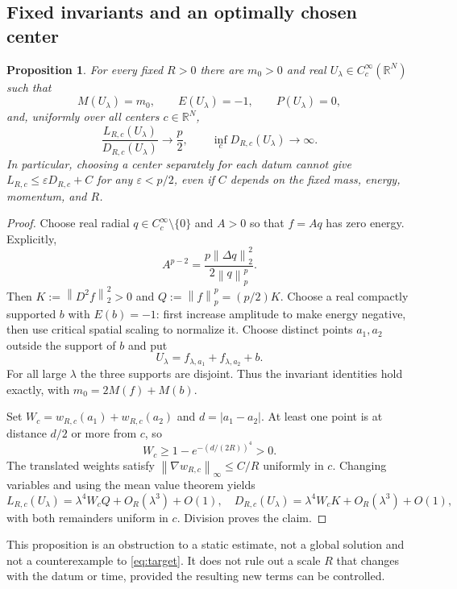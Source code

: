\documentclass[11pt,a4paper]{article}
\newtheorem{proposition}[theorem]{Proposition}
\theoremstyle{remark}\newtheorem{remark}[theorem]{Remark}
\newcommand{\R}{\mathbb R}
\newcommand{\norm}[1]{\left\|#1\right\|}
\begin{document}
\subsection{Fixed invariants and an optimally chosen center}
\begin{proposition}\label{prop:nogo}
For every fixed $R>0$ there are $m_0>0$ and real $U_\lambda\in C_c^\infty(\R^N)$ such that
\[
 M(U_\lambda)=m_0,\qquad E(U_\lambda)=-1,\qquad P(U_\lambda)=0,
\]
and, uniformly over all centers $c\in\R^N$,
\[
 \frac{L_{R,c}(U_\lambda)}{D_{R,c}(U_\lambda)}\longrightarrow\frac p2,
 \qquad \inf_c D_{R,c}(U_\lambda)\longrightarrow\infty.
\]
In particular, choosing a center separately for each datum cannot give
$L_{R,c}\le\varepsilon D_{R,c}+C$ for any $\varepsilon<p/2$, even if $C$ depends on the fixed mass, energy, momentum, and $R$.
\end{proposition}
\begin{proof}
Choose real radial $q\in C_c^\infty\setminus\{0\}$ and $A>0$ so that $f=Aq$ has zero energy. Explicitly,
\[
 A^{p-2}=\frac{p\norm{\Delta q}_2^2}{2\norm q_p^p}.
\]
Then $K:=\norm{D^2f}_2^2>0$ and $Q:=\norm f_p^p=(p/2)K$. Choose a real compactly supported $b$ with $E(b)=-1$: first increase amplitude to make energy negative, then use critical spatial scaling to normalize it. Choose distinct points $a_1,a_2$ outside the support of $b$ and put
\[
 U_\lambda=f_{\lambda,a_1}+f_{\lambda,a_2}+b.
\]
For all large $\lambda$ the three supports are disjoint. Thus the invariant identities hold exactly, with $m_0=2M(f)+M(b)$.

Set $W_c=w_{R,c}(a_1)+w_{R,c}(a_2)$ and $d=|a_1-a_2|$. At least one point is at distance $d/2$ or more from $c$, so
\[
 W_c\ge1-e^{-(d/(2R))^4}>0.
\]
The translated weights satisfy $\norm{\nabla w_{R,c}}_\infty\le C/R$ uniformly in $c$. Changing variables and using the mean value theorem yields
\[
 L_{R,c}(U_\lambda)=\lambda^4W_cQ+O_R(\lambda^3)+O(1),\quad
 D_{R,c}(U_\lambda)=\lambda^4W_cK+O_R(\lambda^3)+O(1),
\]
with both remainders uniform in $c$. Division proves the claim.
\end{proof}

This proposition is an obstruction to a static estimate, not a global solution and not a counterexample to \eqref{eq:target}. It does not rule out a scale $R$ that changes with the datum or time, provided the resulting new terms can be controlled.
\end{document}
